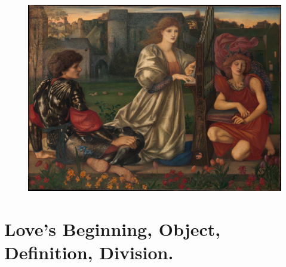 {\begin{figure}[H]
  \begingroup
  \centering
  \includegraphics[keepaspectratio,width=\textwidth]{figures/The-Love-Song-Edward-Burne-Jones-small.jpg}
  \label{fig:thelovesong}
\end{figure}

\section{Love's Beginning, Object, Definition, Division.}

}

